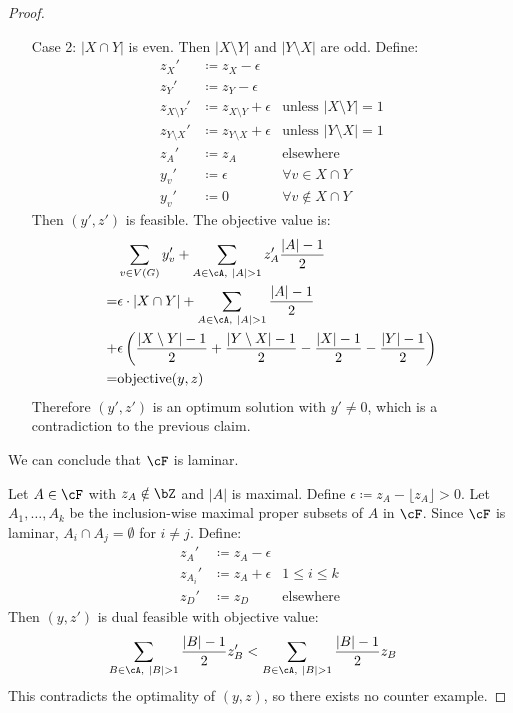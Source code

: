 \documentclass[11pt, a4paper]{article}
\newcommand{\floor}[1]{\lfloor #1 \rfloor}
\newcommand{\abs}[1]{\left\lvert#1\right\rvert}
\theoremstyle{remark}
\theoremstyle{definition}
\begin{document}
\begin{proof}
\begin{enumerate}
		\item[Case 2:] $\abs{X\cap Y}$ is even. Then $\abs{X\setminus Y}$ and
		$\abs{Y\setminus X}$ are odd. Define:
		\begin{align*}
			z_X'              & \coloneqq z_X-\epsilon                                         \\
			z_Y'              & \coloneqq z_Y-\epsilon                                         \\
			z_{X\setminus Y}' & \coloneqq z_{X\setminus Y}+\epsilon
			                  & \text{unless $\abs{X\setminus Y}=1$}                           \\
			z_{Y\setminus X}' & \coloneqq z_{Y\setminus X}+\epsilon
			                  & \text{unless $\abs{Y\setminus X}=1$}                           \\
			z_{A}'            & \coloneqq z_A                        & \text{elsewhere}        \\
			y_v'              & \coloneqq \epsilon                   & \forall v\in X\cap Y    \\
			y_v'              & \coloneqq 0                          & \forall v\notin X\cap Y
		\end{align*}
		Then $(y',z')$ is feasible. The objective value is:
		\begin{align*}
			  & \sum_{v\in V(G)}y_v'
			+\sum_{A\in\cA,\ \abs{A}>1}z_A'\frac{\abs{A}-1}{2} \\
			= & \epsilon\cdot\abs{X\cap Y}
			+\sum_{A\in\cA,\ \abs{A}>1}\frac{\abs{A}-1}{2}     \\
			+ & \epsilon\left(\frac{\abs{X\setminus Y}-1}{2}
			+\frac{\abs{Y\setminus X}-1}{2}-\frac{\abs{X}-1}{2}
			-\frac{\abs{Y}-1}{2}\right)                        \\
			= & \mathrm{objective}(y,z)
		\end{align*}
		Therefore $(y',z')$ is an optimum solution with $y'\neq0$, which is
		a contradiction to the previous claim.
	\end{enumerate}
	We can conclude that $\cF$ is laminar.

	Let $A\in\cF$ with $z_A\notin\bZ$ and $\abs{A}$ is maximal. Define
	$\epsilon\coloneqq z_A-\floor{z_A}>0$. Let $A_1,\ldots,A_k$ be the
	inclusion-wise maximal proper subsets of $A$ in $\cF$. Since $\cF$ is
	laminar, $A_i\cap A_j=\emptyset$ for $i\neq j$. Define:
	\begin{align*}
		z_A'     & \coloneqq z_A-\epsilon                    \\
		z_{A_i}' & \coloneqq z_A+\epsilon & 1\leq i\leq k    \\
		z_D'     & \coloneqq z_D          & \text{elsewhere}
	\end{align*}
	Then $(y,z')$ is dual feasible with objective value:
	\begin{align*}
		\sum_{B\in\cA,\ \abs{B}>1}\frac{\abs{B}-1}{2}z_B'
		 & <\sum_{B\in\cA,\ \abs{B}>1}\frac{\abs{B}-1}{2}z_B
	\end{align*}
	This contradicts the optimality of $(y,z)$, so there exists no counter
	example.
\end{proof}
\end{document}
